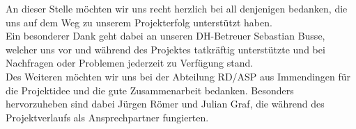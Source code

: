 
An dieser Stelle möchten wir uns recht herzlich bei all denjenigen bedanken, die uns auf dem Weg zu unserem Projekterfolg unterstützt haben. \\
Ein besonderer Dank geht dabei an unseren DH-Betreuer Sebastian Busse, welcher uns vor und während des Projektes tatkräftig unterstützte und bei Nachfragen oder Problemen jederzeit zu Verfügung stand. \\
Des Weiteren möchten wir uns bei der Abteilung \ac{RD/ASP} aus Immendingen für die Projektidee und die gute Zusammenarbeit bedanken. Besonders hervorzuheben sind dabei Jürgen Römer und Julian Graf, die während des Projektverlaufs als Ansprechpartner fungierten.